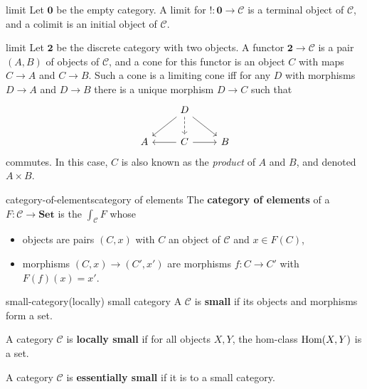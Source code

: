 \begin{example}{limit}
    Let $\textbf{0}$ be the empty category. A limit for $! \colon \textbf{0} \to \mathcal{C}$ is a terminal object of $\mathcal{C}$, and a colimit is an initial object of $\mathcal{C}$.
\end{example}

\begin{example}{limit}
    Let $\textbf{2}$ be the discrete category with two objects. A functor $\textbf{2} \to \mathcal{C}$ is a pair $(A, B)$ of objects of $\mathcal{C}$, and a cone for this functor is an object $C$ with maps $C \to A$ and $C \to B$. Such a cone is a limiting cone iff for any $D$ with morphisms $D \to A$ and $D \to B$ there is a unique morphism $D \to C$ such that
    \[ \svg \begin{tikzcd} & D \arrow[dashed]{d} \arrow{ld} \arrow{rd} & \\ A & \arrow{l} C \arrow{r} & B \end{tikzcd} \]
    commutes. In this case, $C$ is also known as the \textit{product} of $A$ and $B$, and denoted $A \times B$.
\end{example}

\begin{topic}{category-of-elements}{category of elements}
    The \textbf{category of elements} of a  $F \colon \mathcal{C} \to \textbf{Set}$ is the  $\int_\mathcal{C} F$ whose
    \begin{itemize}
        \item objects are pairs $(C, x)$ with $C$ an object of $\mathcal{C}$ and $x \in F(C)$,
        \item morphisms $(C, x) \to (C', x')$ are morphisms $f \colon C \to C'$ with $F(f)(x) = x'$.
    \end{itemize}
\end{topic}

\begin{topic}{small-category}{(locally) small category}
    A  $\mathcal{C}$ is \textbf{small} if its objects and morphisms form a set.
    
    A category $\mathcal{C}$ is \textbf{locally small} if for all objects $X, Y$, the hom-class $\operatorname{Hom}(X, Y)$ is a set.
    
    A category $\mathcal{C}$ is \textbf{essentially small} if it is  to a small category.
\end{topic}

